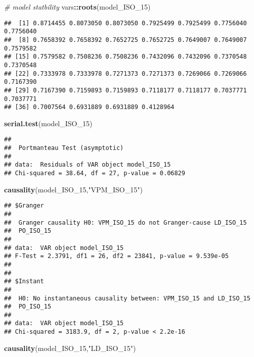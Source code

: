 \documentclass[
]{article}
\newenvironment{Shaded}{\begin{snugshade}}{\end{snugshade}}
\newcommand{\CommentTok}[1]{\textcolor[rgb]{0.56,0.35,0.01}{\textit{#1}}}
\newcommand{\FunctionTok}[1]{\textcolor[rgb]{0.13,0.29,0.53}{\textbf{#1}}}
\newcommand{\NormalTok}[1]{#1}
\newcommand{\SpecialCharTok}[1]{\textcolor[rgb]{0.81,0.36,0.00}{\textbf{#1}}}
\newcommand{\StringTok}[1]{\textcolor[rgb]{0.31,0.60,0.02}{#1}}
\begin{document}
\begin{Shaded}
\begin{Highlighting}[]
\CommentTok{\# model statbility}
\NormalTok{vars}\SpecialCharTok{::}\FunctionTok{roots}\NormalTok{(model\_ISO\_15)}
\end{Highlighting}
\end{Shaded}

\begin{verbatim}
##  [1] 0.8714455 0.8073050 0.8073050 0.7925499 0.7925499 0.7756040 0.7756040
##  [8] 0.7658392 0.7658392 0.7652725 0.7652725 0.7649007 0.7649007 0.7579582
## [15] 0.7579582 0.7508236 0.7508236 0.7432096 0.7432096 0.7370548 0.7370548
## [22] 0.7333978 0.7333978 0.7271373 0.7271373 0.7269066 0.7269066 0.7167390
## [29] 0.7167390 0.7159893 0.7159893 0.7118177 0.7118177 0.7037771 0.7037771
## [36] 0.7007564 0.6931889 0.6931889 0.4128964
\end{verbatim}

\begin{Shaded}
\begin{Highlighting}[]
\FunctionTok{serial.test}\NormalTok{(model\_ISO\_15)}
\end{Highlighting}
\end{Shaded}

\begin{verbatim}
## 
##  Portmanteau Test (asymptotic)
## 
## data:  Residuals of VAR object model_ISO_15
## Chi-squared = 38.64, df = 27, p-value = 0.06829
\end{verbatim}

\begin{Shaded}
\begin{Highlighting}[]
\FunctionTok{causality}\NormalTok{(model\_ISO\_15,}\StringTok{"VPM\_ISO\_15"}\NormalTok{)}
\end{Highlighting}
\end{Shaded}

\begin{verbatim}
## $Granger
## 
##  Granger causality H0: VPM_ISO_15 do not Granger-cause LD_ISO_15
##  PO_ISO_15
## 
## data:  VAR object model_ISO_15
## F-Test = 2.3791, df1 = 26, df2 = 23841, p-value = 9.539e-05
## 
## 
## $Instant
## 
##  H0: No instantaneous causality between: VPM_ISO_15 and LD_ISO_15
##  PO_ISO_15
## 
## data:  VAR object model_ISO_15
## Chi-squared = 3183.9, df = 2, p-value < 2.2e-16
\end{verbatim}

\begin{Shaded}
\begin{Highlighting}[]
\FunctionTok{causality}\NormalTok{(model\_ISO\_15,}\StringTok{"LD\_ISO\_15"}\NormalTok{)}
\end{Highlighting}
\end{Shaded}
\end{document}
